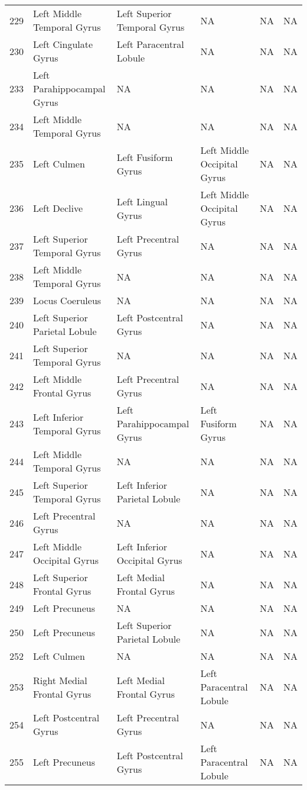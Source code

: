 \documentclass[10pt,letterpaper]{article}\usepackage[]{graphicx}\usepackage[]{color}
\begin{document}
\begin{center}
\begin{longtable}[c]{cp{1.1in}p{1.1in}p{1.1in}p{1.1in}p{1.1in}}
		229	& Left Middle Temporal Gyrus & Left Superior Temporal Gyrus	& NA & NA & NA \\
		230	& Left Cingulate Gyrus & Left Paracentral Lobule & NA & NA & NA \\
		233	& Left Parahippocampal Gyrus & NA & NA & NA	& NA \\
		234	& Left Middle Temporal Gyrus & NA & NA & NA & NA \\
		235	& Left Culmen & Left Fusiform Gyrus	& Left Middle Occipital Gyrus & NA & NA \\
		236	& Left Declive & Left Lingual Gyrus	& Left Middle Occipital Gyrus & NA & NA \\
		237	& Left Superior Temporal Gyrus & Left Precentral Gyrus & NA	& NA & NA \\
		238	& Left Middle Temporal Gyrus & NA & NA & NA	& NA \\
		239	& Locus Coeruleus & NA & NA	& NA & NA \\
		240	& Left Superior Parietal Lobule	& Left Postcentral Gyrus & NA & NA & NA \\
		241	& Left Superior Temporal Gyrus & NA	& NA & NA & NA \\
		242	& Left Middle Frontal Gyrus	& Left Precentral Gyrus	& NA & NA & NA \\
		243	& Left Inferior Temporal Gyrus & Left Parahippocampal Gyrus	& Left Fusiform Gyrus & NA & NA \\
		244	& Left Middle Temporal Gyrus & NA & NA & NA	& NA \\
		245	& Left Superior Temporal Gyrus & Left Inferior Parietal Lobule & NA	& NA & NA \\
		246	& Left Precentral Gyrus	& NA & NA & NA & NA \\
		247	& Left Middle Occipital Gyrus & Left Inferior Occipital Gyrus & NA & NA	& NA \\
		248	& Left Superior Frontal Gyrus & Left Medial Frontal Gyrus & NA & NA & NA \\
		249	& Left Precuneus & NA & NA & NA	& NA \\
		250	& Left Precuneus & Left Superior Parietal Lobule & NA & NA & NA \\
		252	& Left Culmen & NA & NA	& NA & NA \\
		253	& Right Medial Frontal Gyrus & Left Medial Frontal Gyrus & Left Paracentral Lobule & NA	& NA \\
		254	& Left Postcentral Gyrus & Left Precentral Gyrus & NA & NA & NA \\
		255	& Left Precuneus & Left Postcentral Gyrus & Left Paracentral Lobule & NA & NA \\

\end{longtable}
\end{center}
\end{document}

